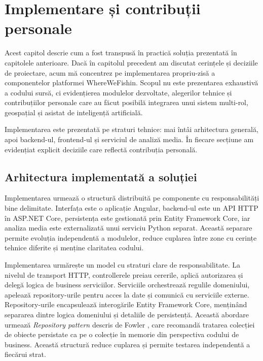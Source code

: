﻿\chapter{Implementare și contribuții personale}

Acest capitol descrie cum a fost transpusă în practică soluția prezentată în capitolele anterioare. Dacă în capitolul precedent am discutat cerințele și deciziile de proiectare, acum mă concentrez pe implementarea propriu-zisă a componentelor platformei WhereWeFishin. Scopul nu este prezentarea exhaustivă a codului sursă, ci evidențierea modulelor dezvoltate, alegerilor tehnice și contribuțiilor personale care au făcut posibilă integrarea unui sistem multi-rol, geospațial și asistat de inteligență artificială.

Implementarea este prezentată pe straturi tehnice: mai întâi arhitectura generală, apoi backend-ul, frontend-ul și serviciul de analiză media. În fiecare secțiune am evidențiat explicit deciziile care reflectă contribuția personală.

\section{Arhitectura implementată a soluției}

Implementarea urmează o structură distribuită pe componente cu responsabilități bine delimitate. Interfața este o aplicație Angular, backend-ul este un API HTTP în ASP.NET Core, persistența este gestionată prin Entity Framework Core, iar analiza media este externalizată unui serviciu Python separat. Această separare permite evoluția independentă a modulelor, reduce cuplarea între zone cu cerințe tehnice diferite și menține claritatea codului.

Implementarea urmărește un model cu straturi clare de responsabilitate. La nivelul de transport HTTP, controllerele preiau cererile, aplică autorizarea și delegă logica de business serviciilor. Serviciile orchestrează regulile domeniului, apelează repository-urile pentru acces la date și comunică cu serviciile externe. Repository-urile encapsulează interogările Entity Framework Core, menținând separarea dintre logica domeniului și detaliile de persistență. Această abordare urmează \emph{Repository pattern} descris de Fowler \citep{fowler2002}, care recomandă tratarea colecției de obiecte persistate ca pe o colecție în memorie din perspectiva codului de business. Această structură reduce cuplarea și permite testarea independentă a fiecărui strat.

